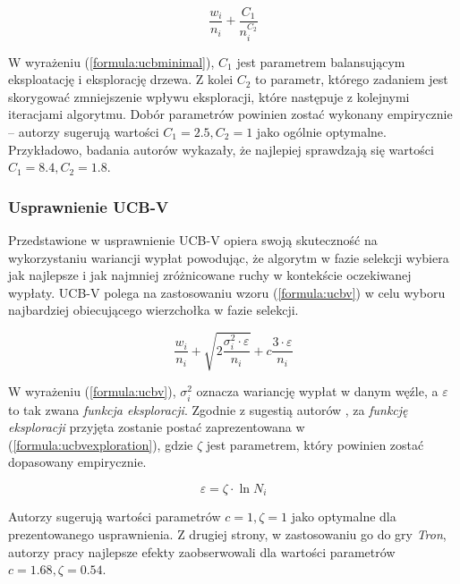 \documentclass[a4paper,12pt]{article}
\begin{document}
\begin{equation}\label{formula:ucbminimal}
\frac{w_i}{n_i} + \frac{C_1}{n_i^{C_2}}
\end{equation}

W wyrażeniu (\ref{formula:ucbminimal}), $C_1$ jest parametrem balansującym eksploatację i eksplorację drzewa. Z kolei $C_2$ to parametr, którego zadaniem jest skorygować zmniejszenie wpływu eksploracji, które następuje z kolejnymi iteracjami algorytmu. Dobór parametrów powinien zostać wykonany empirycznie -- autorzy \cite{ucbminimal} sugerują wartości $C_1=2.5, C_2 = 1$ jako ogólnie optymalne. Przykładowo, badania autorów \cite{tron} wykazały, że najlepiej sprawdzają się wartości $C_1 = 8.4, C_2 = 1.8$.

\subsubsection{Usprawnienie UCB-V} \label{subsec:ucbv}
Przedstawione w \cite{ucbv} usprawnienie UCB-V opiera swoją skuteczność na wykorzystaniu wariancji wypłat powodując, że algorytm w fazie selekcji wybiera jak najlepsze i jak najmniej zróżnicowane ruchy w kontekście oczekiwanej wypłaty. UCB-V polega na zastosowaniu wzoru (\ref{formula:ucbv}) w celu wyboru najbardziej obiecującego wierzchołka w fazie selekcji.

\begin{equation}\label{formula:ucbv}
\frac{w_i}{n_i} + \sqrt{2\frac{\sigma^2_i \cdot \varepsilon}{n_i}} + c \frac{3\cdot\varepsilon}{n_i}
\end{equation}

W wyrażeniu (\ref{formula:ucbv}), $\sigma^2_i$ oznacza wariancję wypłat w danym węźle, a $\varepsilon$ to tak zwana \textit{funkcja eksploracji}. Zgodnie z sugestią autorów \cite{ucbv}, za \textit{funkcję eksploracji} przyjęta zostanie postać zaprezentowana w (\ref{formula:ucbvexploration}), gdzie $\zeta$ jest parametrem, który powinien zostać dopasowany empirycznie.

\begin{equation}\label{formula:ucbvexploration}
\varepsilon = \zeta\cdot\ln N_i
\end{equation}

Autorzy \cite{ucbv} sugerują wartości parametrów $c=1, \zeta=1$ jako optymalne dla prezentowanego usprawnienia. Z drugiej strony, w zastosowaniu go do gry \textit{Tron}, autorzy pracy \cite{tron} najlepsze efekty zaobserwowali dla wartości parametrów $c=1.68, \zeta = 0.54$.
\end{document}
